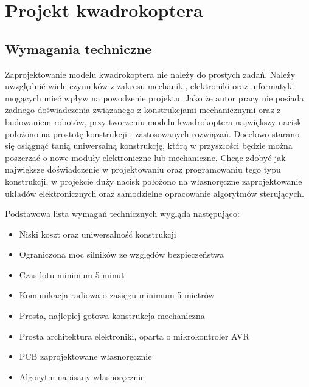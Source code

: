 
\chapter{Projekt kwadrokoptera} %

\label{Chapter5} %



\section{Wymagania techniczne}

Zaprojektowanie modelu kwadrokoptera nie należy do prostych zadań. Należy uwzględnić wiele czynników z zakresu mechaniki, elektroniki oraz informatyki mogących mieć wpływ na powodzenie projektu. Jako że autor pracy nie posiada żadnego doświadczenia związanego z konstrukcjami mechanicznymi oraz z budowaniem robotów, przy tworzeniu modelu kwadrokoptera największy nacisk położono na prostotę konstrukcji i zastosowanych rozwiązań. Docelowo starano się osiągnąć tanią uniwersalną konstrukcję, którą w przyszłości będzie można poszerzać o nowe moduły elektroniczne lub mechaniczne. Chcąc zdobyć jak największe doświadczenie w projektowaniu oraz programowaniu tego typu konstrukcji, w projekcie duży nacisk położono na własnoręczne zaprojektowanie układów elektronicznych oraz samodzielne opracowanie algorytmów sterujących.

Podstawowa lista wymagań technicznych wygląda następująco:

\begin{itemize}
	\item Niski koszt oraz uniwersalność konstrukcji
	\item Ograniczona moc silników ze względów bezpieczeństwa
	\item Czas lotu minimum 5 minut
	\item Komunikacja radiowa o zasięgu minimum 5 mietrów
	\item Prosta, najlepiej gotowa konstrukcja mechaniczna
	\item Prosta architektura elektroniki, oparta o mikrokontroler AVR
	\item PCB zaprojektowane własnoręcznie
	\item Algorytm napisany własnoręcznie
\end{itemize}

